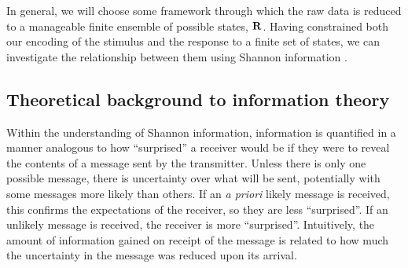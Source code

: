 
In general, we will choose some framework through which the raw data is reduced to a manageable finite ensemble of possible states, $\mathbf{R}$.
Having constrained both our encoding of the stimulus and the response to a finite set of states, we can investigate the relationship between them using Shannon information \citep{Shannon1948}.


\subsection{Theoretical background to information theory}

Within the understanding of Shannon information, information is quantified in a manner analogous to how ``surprised'' a receiver would be if they were to reveal the contents of a message sent by the transmitter.
Unless there is only one possible message, there is uncertainty over what will be sent, potentially with some messages more likely than others.
If an \textit{a priori} likely message is received, this confirms the expectations of the receiver, so they are less ``surprised''.
If an unlikely message is received, the receiver is more ``surprised''.
Intuitively, the amount of information gained on receipt of the message is related to how much the uncertainty in the message was reduced upon its arrival.

